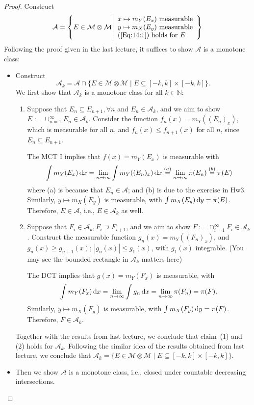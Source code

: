 \begin{proof}
Construct 
\[
\mathcal{A}=\left\{E\in\mathcal{M}\otimes\mathcal{M}\middle| 
\begin{array}{l}
x\mapsto m_Y(E_x)\text{ measurable}\\
y\mapsto m_X(E_y)\text{ measurable}\\
(\ref{Eq:14:1})\text{ holds for $E$}
\end{array}\right\}
\]
Following the proof given in the last lecture, it suffices to show $\mathcal{A}$ is a monotone class:
\begin{itemize}
\item
Construct 
\[
\mathcal{A}_k=\mathcal{A}\cap \{E\in\mathcal{M}\otimes\mathcal{M}\mid E\subseteq[-k,k]\times[-k,k]\}.
\]
We first show that $\mathcal{A}_k$ is a monotone class for all $k\in\mathbb{N}$:
\begin{enumerate}
\item
Suppose that $E_n\subseteq E_{n+1},\forall n$ and $E_n\in \mathcal{A}_k$, and we aim to show $E:=\cup_{n=1}^\infty E_n\in\mathcal{A}_k$.
Consider the function $f_n(x)=m_Y((E_n)_x)$, which is measurable for all $n$, and $f_n(x)\le f_{n+1}(x)$ for all $n$, since $E_n\subseteq E_{n+1}$.

The MCT I implies that $f(x)=m_Y(E_x)$ is measurable with
\[
\int m_Y(E_x)\,\mathrm{d} x
=
\lim_{n\to\infty}\int m_Y((E_n)_x)\,\mathrm{d} x
\stackrel{(a)}{=}
\lim_{n\to\infty}\pi(E_n)
\stackrel{(b)}{=}
\pi(E)
\]
where (a) is because that $E_n\in\mathcal{A}$; and (b) is due to the exercise in Hw3.
Similarly, $y\mapsto m_X(E_y)$ is measurable, with $\int m_X(E_y)\,\mathrm{d} y=\pi(E)$.
Therefore, $E\in\mathcal{A}$, i.e., $E\in\mathcal{A}_k$ as well.
\item
Suppose that $F_i\in\mathcal{A}_k, F_i\supseteq F_{i+1}$, and we aim to show $F:=\cap_{i=1}^\infty F_i\in\mathcal{A}_k$.
Construct the measurable function $g_n(x)=m_Y((F_n)_x)$, and $g_n(x)\ge g_{n+1}(x)$;
$|g_n(x)|\le g_1(x)$, with $g_1(x)$ integrable. (You may see the bounded rectangle in $\mathcal{A}_k$ matters here)

The DCT implies that $g(x)=m_Y(F_x)$ is measurable, with 
\[
\int m_Y(F_x)\,\mathrm{d} x = \lim_{n\to\infty}\int g_n\,\mathrm{d} x=\lim_{n\to\infty}\pi(F_n)=\pi(F).
\]
Similarly, $y\mapsto m_X(F_y)$ is measurable, with $\int m_X(F_y)\,\mathrm{d} y = \pi(F)$.
Therefore, $F\in\mathcal{A}_k$.
\end{enumerate}
Together with the results from last lecture, we conclude that claim~(1) and (2) holds for $\mathcal{A}_k$.
Following the similar idea of the results obtained from last lecture, we conclude that $\mathcal{A}_k = \{E\in\mathcal{M}\otimes\mathcal{M}\mid E\subseteq[-k,k]\times[-k,k]\}$.
\item
Then we show $\mathcal{A}$ is a monotone class, i.e., closed under countable decreasing intersections.


\end{itemize}
\end{proof}
